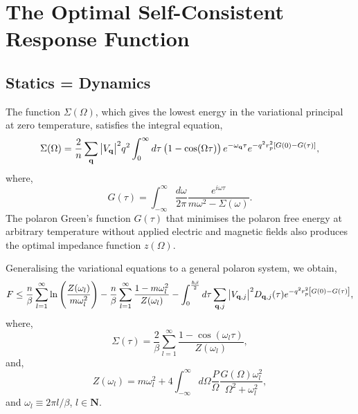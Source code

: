 \section{The Optimal Self-Consistent Response Function}
\label{sec:chap-fifth-third}

\subsection{Statics = Dynamics}

The function $\Sigma(\Omega)$, which gives the lowest energy in the variational principal at zero temperature, satisfies the integral equation,
\begin{equation}
    \Sigma(\Omega) = \frac{2}{n} \sum_{\vb{q}} \abs{V_{\vb{q}}}^2 q^2 \int^\infty_0 d\tau \left( 1 - \cos(\Omega \tau) \right)  e^{-\omega_{\vb{q}} \tau} e^{-q^2 r_p^2 [G(0) - G(\tau)]}, 
\end{equation}
where,
\begin{equation}
    G(\tau) = \int_{-\infty}^\infty \frac{d\omega}{2\pi} \frac{ e^{i \omega \tau} }{m \omega^2 - \Sigma(\omega)} .
\end{equation}
The polaron Green's function $G(\tau)$ that minimises the polaron free energy at arbitrary temperature without applied electric and magnetic fields also produces the optimal impedance function $z(\Omega)$. 

Generalising the variational equations to a general polaron system, we obtain,
\begin{equation}
    F \leq \frac{n}{\beta} \sum_{l=1}^\infty \ln \left( \frac{Z(\omega_l)}{m \omega_l^2} \right) - \frac{n}{\beta} \sum_{l=1}^\infty \frac{1 - m \omega^2_l}{Z(\omega_l)} - \int_0^{\frac{\hbar\beta}{2}} d\tau \sum_{\vb{q}, j} \abs{V_{\vb{q}, j}}^2 D_{\vb{q}, j}(\tau) e^{-q^2 r_p^2 \left[G(0) - G(\tau)\right]},
\end{equation}
where,
\begin{equation}
    \Sigma(\tau) = \frac{2}{\beta} \sum_{l = 1}^\infty \frac{1 - \cos\left(\omega_l \tau \right)}{Z(\omega_l)},
\end{equation}
and,
\begin{equation}
    Z(\omega_l) = m \omega_l^2 + 4 \int_{-\infty}^\infty d\Omega \frac{P}{\Omega} \frac{G(\Omega) \omega^2_l}{\Omega^2 + \omega_l^2},
\end{equation}
and $\omega_l \equiv 2\pi l / \beta$, $l \in \mathbf{N}$.